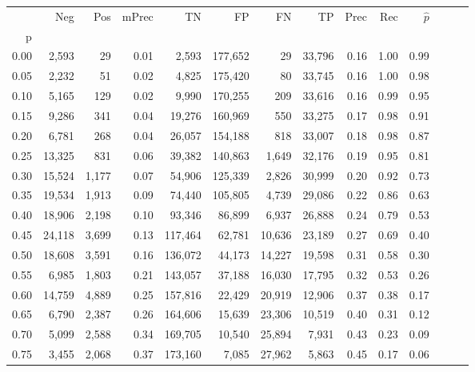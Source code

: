\begin{tabular}{rrrrrrrrrrrrrr}
\toprule
{} &     Neg &    Pos & mPrec &       TN &       FP &      FN &      TP &  Prec &   Rec & $\hat{p}$ \\
p    &         &        &       &          &          &         &         &       &       &           \\
\midrule
0.00 &   2,593 &     29 &  0.01 &    2,593 &  177,652 &      29 &  33,796 &  0.16 &  1.00 &      0.99 \\
0.05 &   2,232 &     51 &  0.02 &    4,825 &  175,420 &      80 &  33,745 &  0.16 &  1.00 &      0.98 \\
0.10 &   5,165 &    129 &  0.02 &    9,990 &  170,255 &     209 &  33,616 &  0.16 &  0.99 &      0.95 \\
0.15 &   9,286 &    341 &  0.04 &   19,276 &  160,969 &     550 &  33,275 &  0.17 &  0.98 &      0.91 \\
0.20 &   6,781 &    268 &  0.04 &   26,057 &  154,188 &     818 &  33,007 &  0.18 &  0.98 &      0.87 \\
0.25 &  13,325 &    831 &  0.06 &   39,382 &  140,863 &   1,649 &  32,176 &  0.19 &  0.95 &      0.81 \\
0.30 &  15,524 &  1,177 &  0.07 &   54,906 &  125,339 &   2,826 &  30,999 &  0.20 &  0.92 &      0.73 \\
0.35 &  19,534 &  1,913 &  0.09 &   74,440 &  105,805 &   4,739 &  29,086 &  0.22 &  0.86 &      0.63 \\
0.40 &  18,906 &  2,198 &  0.10 &   93,346 &   86,899 &   6,937 &  26,888 &  0.24 &  0.79 &      0.53 \\
0.45 &  24,118 &  3,699 &  0.13 &  117,464 &   62,781 &  10,636 &  23,189 &  0.27 &  0.69 &      0.40 \\
0.50 &  18,608 &  3,591 &  0.16 &  136,072 &   44,173 &  14,227 &  19,598 &  0.31 &  0.58 &      0.30 \\
0.55 &   6,985 &  1,803 &  0.21 &  143,057 &   37,188 &  16,030 &  17,795 &  0.32 &  0.53 &      0.26 \\
0.60 &  14,759 &  4,889 &  0.25 &  157,816 &   22,429 &  20,919 &  12,906 &  0.37 &  0.38 &      0.17 \\
0.65 &   6,790 &  2,387 &  0.26 &  164,606 &   15,639 &  23,306 &  10,519 &  0.40 &  0.31 &      0.12 \\
0.70 &   5,099 &  2,588 &  0.34 &  169,705 &   10,540 &  25,894 &   7,931 &  0.43 &  0.23 &      0.09 \\
0.75 &   3,455 &  2,068 &  0.37 &  173,160 &    7,085 &  27,962 &   5,863 &  0.45 &  0.17 &      0.06 \\

\end{tabular}
